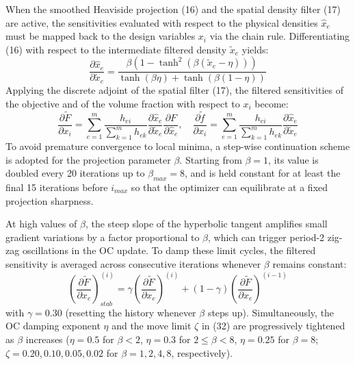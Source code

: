 \documentclass{article}
\begin{document}
\noindent When the smoothed Heaviside projection (16) and the spatial density filter (17) are active, the sensitivities evaluated with respect to the physical densities $\hat{x}_e$ must be mapped back to the design variables $x_i$ via the chain rule. Differentiating (16) with respect to the intermediate filtered density $\tilde{x}_e$ yields:
\begin{equation}
\frac{\partial \hat{x}_e}{\partial \tilde{x}_e} = \frac{\beta \left(1 - \tanh^2(\beta(\tilde{x}_e - \eta))\right)}{\tanh(\beta\eta) + \tanh(\beta(1 - \eta))}
\end{equation}
Applying the discrete adjoint of the spatial filter (17), the filtered sensitivities of the objective and of the volume fraction with respect to $x_i$ become:
\begin{equation}
\frac{\partial \tilde{F}}{\partial x_i} = \sum_{e=1}^{m} \frac{h_{ei}}{\sum_{k=1}^{m} h_{ek}} \frac{\partial \hat{x}_e}{\partial \tilde{x}_e} \frac{\partial F}{\partial \hat{x}_e}, \quad \frac{\partial \tilde{f}}{\partial x_i} = \sum_{e=1}^{m} \frac{h_{ei}}{\sum_{k=1}^{m} h_{ek}} \frac{\partial \hat{x}_e}{\partial \tilde{x}_e}
\end{equation}
To avoid premature convergence to local minima, a step-wise continuation scheme is adopted for the projection parameter $\beta$. Starting from $\beta = 1$, its value is doubled every 20 iterations up to $\beta_{max} = 8$, and is held constant for at least the final 15 iterations before $i_{max}$ so that the optimizer can equilibrate at a fixed projection sharpness.

At high values of $\beta$, the steep slope of the hyperbolic tangent amplifies small gradient variations by a factor proportional to $\beta$, which can trigger period-2 zig-zag oscillations in the OC update. To damp these limit cycles, the filtered sensitivity is averaged across consecutive iterations whenever $\beta$ remains constant:
\begin{equation}
\left(\frac{\partial \tilde{F}}{\partial x_e}\right)^{(i)}_{stab} = \gamma \left(\frac{\partial \tilde{F}}{\partial x_e}\right)^{(i)} + (1 - \gamma) \left(\frac{\partial \tilde{F}}{\partial x_e}\right)^{(i-1)}
\end{equation}
with $\gamma = 0.30$ (resetting the history whenever $\beta$ steps up). Simultaneously, the OC damping exponent $\eta$ and the move limit $\zeta$ in (32) are progressively tightened as $\beta$ increases ($\eta = 0.5$ for $\beta < 2$, $\eta = 0.3$ for $2 \leq \beta < 8$, $\eta = 0.25$ for $\beta = 8$; $\zeta = 0.20, 0.10, 0.05, 0.02$ for $\beta = 1, 2, 4, 8$, respectively).
\end{document}
